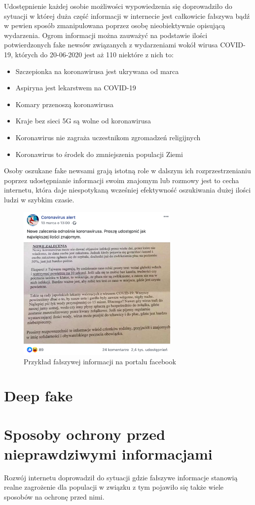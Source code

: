 Udostępnienie każdej osobie możliwości wypowiedzenia się doprowadziło do sytuacji w której duża część informacji w internecie
jest całkowicie fałszywa bądź w pewien sposób zmanipulowana poprzez osobę nieobiektywnie opisującą wydarzenia. Ogrom informacji
można zauważyć na podstawie ilości potwierdzonych fake newsów związanych z wydarzeniami wokół wirusa COVID-19, których do 
20-06-2020 jest aż 110 niektóre z nich to:
\begin{itemize}
    \item Szczepionka na koronawirusa jest ukrywana od marca
    \item Aspiryna jest lekarstwem na COVID-19
    \item Komary przenoszą koronawirusa
    \item Kraje bez sieci 5G są wolne od koronawirusa 
    \item Koronawirus nie zagraża uczestnikom zgromadzeń religijnych
    \item Koronawirus to środek do zmniejszenia populacji Ziemi
\end{itemize}
Osoby oszukane fake newsami grają istotną role w dalszym ich rozprzestrzenianiu poprzez udostępnianie informacji swoim znajomym 
lub rozmowy jest to cecha internetu, która daje niespotykaną wcześniej efektywność oszukiwania dużej ilości ludzi w szybkim
czasie. 
\begin{figure}[h!]
    \centering
    \includegraphics[width=0.7\textwidth]{./Img/cvfakenews.png}
    \caption{Przykład fałszywej informacji na portalu facebook}
\end{figure}
\section{Deep fake}

\section{Sposoby ochrony przed nieprawdziwymi informacjami}
Rozwój internetu doprowadził do sytuacji gdzie fałszywe informacje stanowią realne zagrożenie dla populacji w związku 
z tym pojawiło się także wiele sposobów na ochronę przed nimi.
